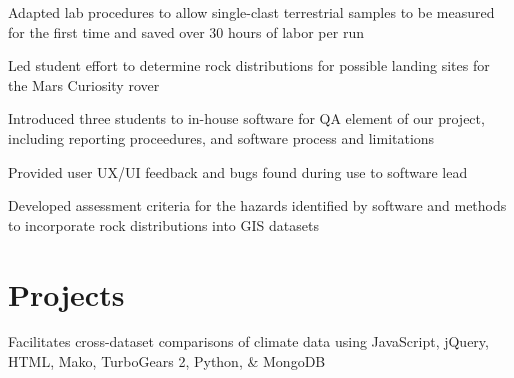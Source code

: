 \documentclass[letterpaper]{deedy-resume} %
\begin{document}
\begin{minipage}[t]{0.66\textwidth}
\sectionspace %



\begin{tightitemize}
\item Adapted lab procedures to allow single-clast terrestrial samples to be measured for the first time and saved over 30 hours of labor per run \\
\end{tightitemize}

\sectionspace %



\begin{tightitemize}
\item Led student effort to determine rock distributions for possible landing sites for the Mars Curiosity rover \\
\item Introduced three students to in-house software for QA element of our project, including reporting proceedures, and software process and limitations \\
\item Provided user UX/UI feedback and bugs found during use to software lead \\
\item Developed assessment criteria for the hazards identified by software and methods to incorporate rock distributions into GIS datasets \\
\end{tightitemize}

\sectionspace %


\section{Projects} 

Facilitates cross-dataset comparisons of climate data using JavaScript, jQuery, HTML, Mako, TurboGears 2, Python, \& MongoDB \\
\sectionspace %


\end{minipage}
\end{document}
